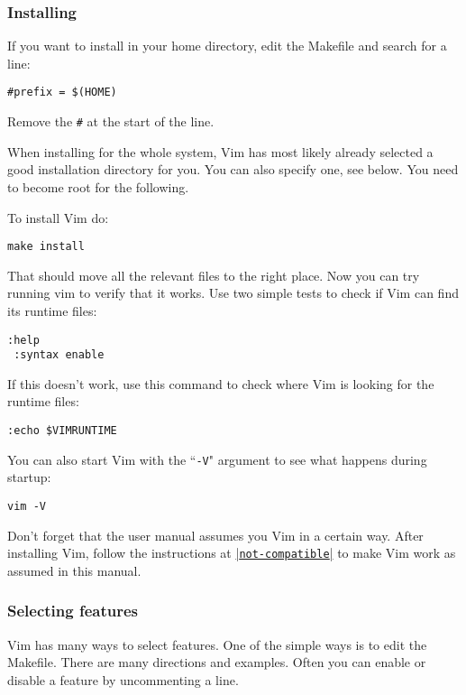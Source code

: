 \subsubsection{Installing}
\label{install-home}
If you want to install in your home directory, edit the Makefile and search for a line:

\begin{Verbatim}[samepage=true]
    #prefix = $(HOME) 
\end{Verbatim}

Remove the \texttt{\#} at the start of the line.

When installing for the whole system, Vim has most likely already selected a good installation directory for you.
You can also specify one, see below.
You need to become root for the following.

To install Vim do:

\begin{Verbatim}[samepage=true]
 make install
\end{Verbatim}

That should move all the relevant files to the right place.
Now you can try running vim to verify that it works.
Use two simple tests to check if Vim can find its runtime files:

\begin{Verbatim}[samepage=true]
 :help
 :syntax enable
\end{Verbatim}

If this doesn't work, use this command to check where Vim is looking for the runtime files:

\begin{Verbatim}[samepage=true]
 :echo $VIMRUNTIME
\end{Verbatim}

You can also start Vim with the ``\texttt{-V}" argument to see what happens during startup:

\begin{Verbatim}[samepage=true]
 vim -V
\end{Verbatim}

Don't forget that the user manual assumes you Vim in a certain way.
After installing Vim, follow the instructions at \hyperref[not-compatible]{|\texttt{not-compatible}|} to make Vim work as assumed in this manual.

\subsubsection{Selecting features}
Vim has many ways to select features.
One of the simple ways is to edit the Makefile.
There are many directions and examples.
Often you can enable or disable a feature by uncommenting a line.

